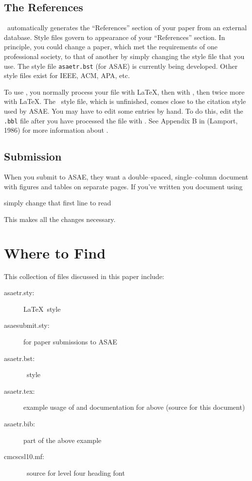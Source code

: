 \subsection{The References}

\BibTeX\ automatically generates the ``References'' section of your
paper from an external database.  Style files govern to appearance of
your ``References'' section.  In principle, you could change a paper,
which met the requirements of one professional society, to that of
another by simply changing the style file that you use.  The style
file {\tt asaetr.bst} (for ASAE) is currently being developed.  Other
style files exist for IEEE, ACM, APA, etc.

To use \BibTeX, you normally process your file with \LaTeX, then with
\BibTeX, then twice more with \LaTeX. The \BibTeX\ style file, which 
is unfinished, comes close to the citation style used by ASAE. You may
have to edit some entries by hand. To do this, edit the {\tt *.bbl}
file after you have processed the file with \BibTeX.  See Appendix B
in \cite{ll:86} (Lamport, 1986) for more information about \BibTeX.

\subsection{Submission}
When you submit to ASAE, they want a double--spaced, single--column
document with figures and tables on separate pages.  If you've written
you document using

\par
\noindent simply change that first line to read\par
{}\par
\noindent This makes all the changes necessary.

\section{Where to Find}
This collection of files discussed in this paper include:
\begin{description}
\item[asaetr.sty:] \LaTeX\ style 
\item[asaesubmit.sty:] for paper submissions to ASAE
\item[asaetr.bst:] \BibTeX\ style 
\item[asaetr.tex:] example usage of and documentation for above (source for
           this document)
\item[asaetr.bib:] part of the above example
\item[cmcscsl10.mf:] \MF\ source for level four heading font
\end{description}

